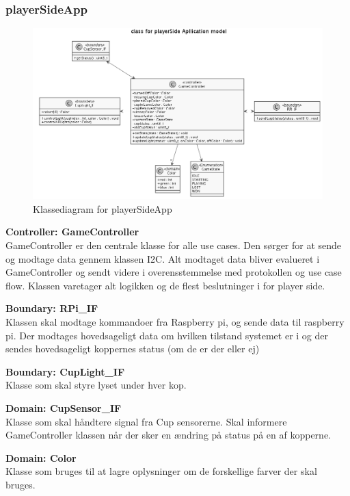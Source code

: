 \documentclass[Arkitektur/System_main.tex]{subfiles}
\begin{document}
\subsubsection{playerSideApp}

\begin{figure}[H]
    \centering
    \includegraphics[width=\textwidth]{Arkitektur/Softwarearkitektur/Applikationsmodel/PlayerSide/graphics/classDiagram.png}
    \caption{Klassediagram for playerSideApp}
    \label{fig:CD_PlayerSide}
\end{figure}

\textbf{Controller:  GameController}\\
GameController er den centrale klasse for alle use cases. Den sørger for at sende og modtage data gennem klassen I2C. Alt modtaget data bliver evalueret i GameController og sendt videre i overensstemmelse med protokollen og use case flow. Klassen varetager alt logikken og de flest beslutninger i for player side. 

\textbf{Boundary:  RPi\_IF}\\
Klassen skal modtage kommandoer fra Raspberry pi, og sende data til raspberry pi. Der modtages hovedsageligt data om hvilken tilstand systemet er i og der sendes hovedsageligt koppernes status (om de er der eller ej)

\textbf{Boundary:  CupLight\_IF}\\
Klasse som skal styre lyset under hver kop.

\textbf{Domain:  CupSensor\_IF}\\
Klasse som skal håndtere signal fra Cup sensorerne. Skal informere GameController klassen når der sker en ændring på status på en af kopperne.


\textbf{Domain:  Color}\\
Klasse som bruges til at lagre oplysninger om de forskellige farver der skal bruges.  
\end{document}
